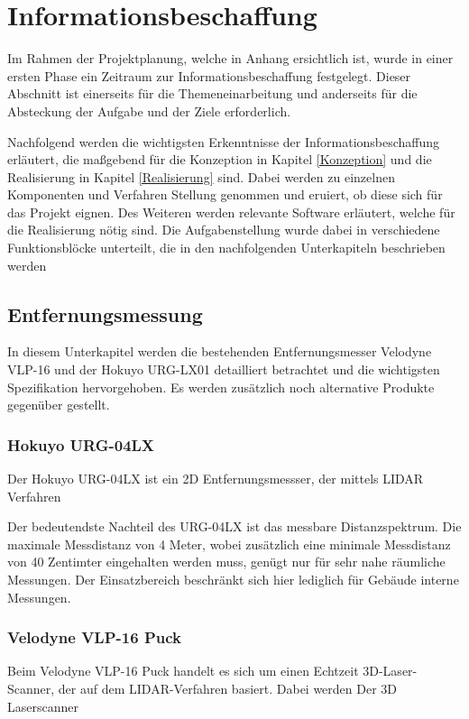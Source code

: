 \chapter{Informationsbeschaffung}
\label{Informationsbeschaffung}

Im Rahmen der Projektplanung, welche in Anhang  ersichtlich ist, wurde in einer ersten Phase ein Zeitraum zur Informationsbeschaffung festgelegt. Dieser Abschnitt ist einerseits für die Themeneinarbeitung und anderseits für die Absteckung der Aufgabe und der Ziele erforderlich.

Nachfolgend werden die wichtigsten Erkenntnisse der Informationsbeschaffung erläutert, die maßgebend für die Konzeption in Kapitel \ref{Konzeption} und die Realisierung in Kapitel \ref{Realisierung} sind. Dabei werden zu einzelnen Komponenten und Verfahren Stellung genommen und eruiert, ob diese sich für das Projekt eignen. Des Weiteren werden relevante Software erläutert, welche für die Realisierung nötig sind. Die Aufgabenstellung wurde dabei in verschiedene Funktionsblöcke unterteilt, die in den nachfolgenden Unterkapiteln beschrieben werden 


\section{Entfernungsmessung}
\label{sec:Entfernungsmessung}
In diesem Unterkapitel werden die bestehenden Entfernungsmesser Velodyne VLP-16 und der Hokuyo URG-LX01 detailliert betrachtet und die wichtigsten Spezifikation hervorgehoben. Es werden zusätzlich noch alternative Produkte gegenüber gestellt.

\subsection{Hokuyo URG-04LX}
\label{subsec:Hokuyo}
Der Hokuyo URG-04LX ist ein 2D Entfernungsmessser, der mittels LIDAR Verfahren 

Der bedeutendste Nachteil des URG-04LX ist das messbare Distanzspektrum. Die maximale Messdistanz von 4 Meter, wobei zusätzlich eine minimale Messdistanz von 40 Zentimter eingehalten werden muss, genügt nur für sehr nahe räumliche Messungen. Der Einsatzbereich beschränkt sich hier lediglich für Gebäude interne Messungen.

\subsection{Velodyne VLP-16 Puck}
\label{subsec:Velodyne}
Beim Velodyne VLP-16 Puck handelt es sich um einen Echtzeit 3D-Laser-Scanner, der auf dem LIDAR-Verfahren basiert. Dabei werden Der 3D Laserscanner

